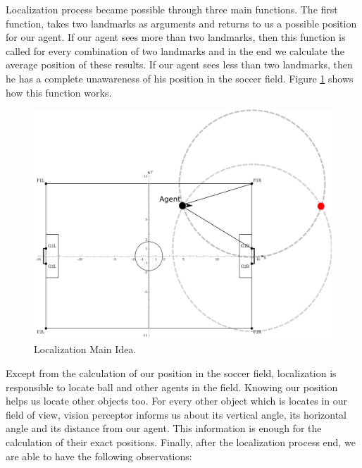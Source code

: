 Localization process became possible through three main functions. The first function, takes two landmarks as arguments and returns to us a possible position for our agent. If our agent sees more than two landmarks, then this function is called for every combination of two landmarks and in the end we calculate the average position of these results. If our agent sees less than two landmarks, then he has a complete unawareness of his position in the soccer field. Figure \ref{fig:Localization} shows how this function works.
\begin{figure}[htb!]
\centering
  \includegraphics[scale=0.5]{Chapter3/figures/Localization.pdf}
  \caption{Localization Main Idea.} 
  \label{fig:Localization}
\end{figure}
Except from the calculation of our position in the soccer field, localization is responsible to locate ball and other agents in the field. Knowing our position helps us locate other objects too. For every other object which is locates in our field of view, vision perceptor informs us about its vertical angle, its horizontal angle and its distance from our agent. This information is enough for the calculation of their exact positions. Finally, after the localization process end, we are able to have the following observations:\\

